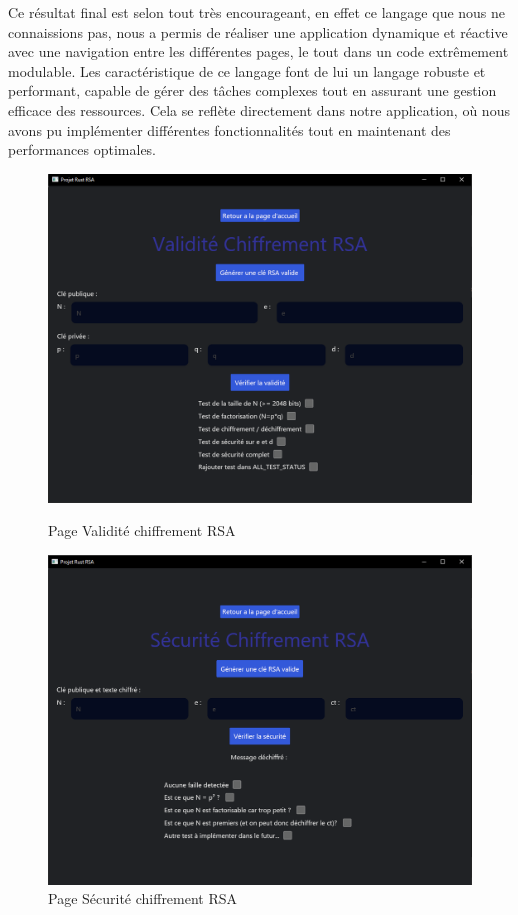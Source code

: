 \documentclass[12pt]{article} %
\begin{document}
	Ce résultat final est selon tout très encourageant, en effet ce langage que nous ne connaissions pas, nous a permis de réaliser une application dynamique et réactive avec une navigation entre les différentes pages, le tout dans un code extrêmement modulable. Les caractéristique de ce langage font de lui un langage robuste et performant, capable de gérer des tâches complexes tout en assurant une gestion efficace des ressources. Cela se reflète directement dans notre application, où nous avons pu implémenter différentes fonctionnalités tout en maintenant des performances optimales.


\begin{figure}[!h]
    \centering
    \begin{minipage}{0.49\textwidth}
        \centering
        \includegraphics[width=\textwidth]{images/validite_chiffrement_rsa.png}
        \caption{Page Validité chiffrement RSA}
        \label{fig:validite_chiffrement_rsa}
    \end{minipage}\hfill
    \begin{minipage}{0.49\textwidth}
        \centering
        \includegraphics[width=\textwidth]{images/securite_chiffrement_rsa.png}
        \caption{Page Sécurité chiffrement RSA}
        \label{fig:securite_chiffrement_rsa}
    \end{minipage}
\end{figure}
\end{document}

